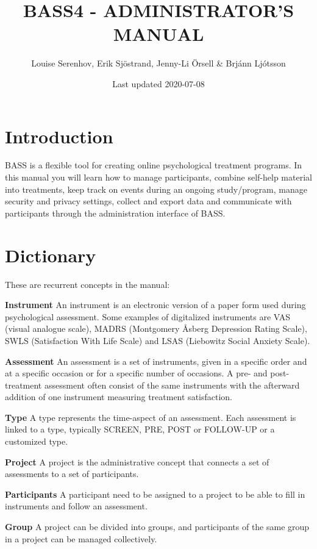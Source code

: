 \documentclass[]{book}
\title{BASS4 - ADMINISTRATOR'S MANUAL}
\author{Louise Serenhov, Erik Sjöstrand, Jenny-Li Örsell \& Brjánn Ljótsson}
\date{Last updated 2020-07-08}
\begin{document}
\maketitle

{
\setcounter{tocdepth}{1}
\tableofcontents
}
\hypertarget{introduction}{%
\chapter{Introduction}\label{introduction}}

BASS is a flexible tool for creating online psychological treatment programs.
In this manual you will learn how to manage participants, combine self-help material into treatments, keep track on events during an ongoing study/program, manage security and privacy settings, collect and export data and communicate with participants through the administration interface of BASS.

\hypertarget{dictionary}{%
\chapter{Dictionary}\label{dictionary}}

These are recurrent concepts in the manual:

\textbf{Instrument}
An instrument is an electronic version of a paper form used during psychological assessment. Some examples of digitalized instruments are VAS (visual analogue scale), MADRS (Montgomery Åsberg Depression Rating Scale), SWLS (Satisfaction With Life Scale) and LSAS (Liebowitz Social Anxiety Scale).

\textbf{Assessment}
An assessment is a set of instruments, given in a specific order and at a specific occasion or for a specific number of occasions. A pre- and post-treatment assessment often consist of the same instruments with the afterward addition of one instrument measuring treatment satisfaction.

\textbf{Type}
A type represents the time-aspect of an assessment. Each assessment is linked to a type, typically SCREEN, PRE, POST or FOLLOW-UP or a customized type.

\textbf{Project}
A project is the administrative concept that connects a set of assessments to a set of participants.

\textbf{Participants}
A participant need to be assigned to a project to be able to fill in instruments and follow an assessment.

\textbf{Group}
A project can be divided into groups, and participants of the same group in a project can be managed collectively.
\end{document}
